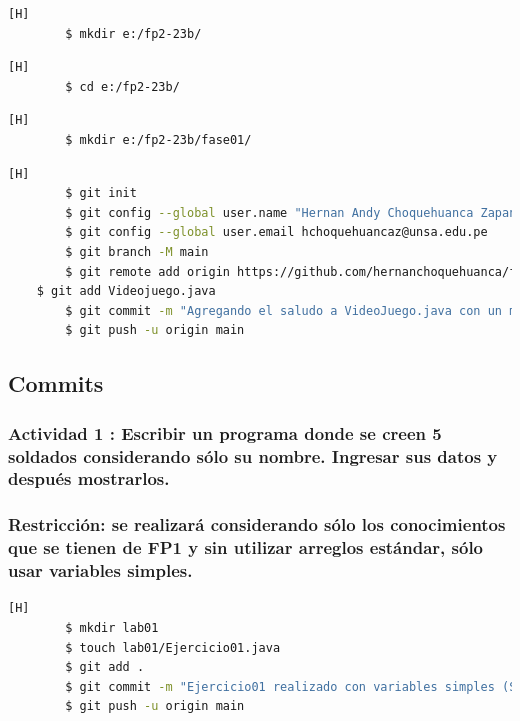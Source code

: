 \documentclass{article}
\begin{document}
	\begin{lstlisting}[language=bash,caption={Creando directorio de trabajo}][H]
		$ mkdir e:/fp2-23b/
	\end{lstlisting}
	\begin{lstlisting}[language=bash,caption={Dirijíéndonos al directorio de trabajo}][H]
		$ cd e:/fp2-23b/
	\end{lstlisting}	
	\begin{lstlisting}[language=bash,caption={Creando directorio para la primera fase}][H]
		$ mkdir e:/fp2-23b/fase01/
	\end{lstlisting}
	\begin{lstlisting}[language=bash,caption={Inicializando directorio para repositorio GitHub}][H]
		$ git init
		$ git config --global user.name "Hernan Andy Choquehuanca Zapana"
		$ git config --global user.email hchoquehuancaz@unsa.edu.pe
		$ git branch -M main
		$ git remote add origin https://github.com/hernanchoquehuanca/fp2-23b.git
   	$ git add Videojuego.java
		$ git commit -m "Agregando el saludo a VideoJuego.java con un mensaje de Bienvenida"
		$ git push -u origin main
	\end{lstlisting}


	\subsection{Commits}
    \subsubsection{Actividad 1 : Escribir un programa donde se creen 5 soldados considerando sólo su nombre. Ingresar sus datos y después mostrarlos. \\\\
    \color{red}Restricción: se realizará considerando sólo los conocimientos que se tienen de FP1 y sin utilizar arreglos estándar, sólo usar variables simples.}
	\begin{lstlisting}[language=bash,caption={Primer commit creando variables para los nombres de soldados}][H]
		$ mkdir lab01
		$ touch lab01/Ejercicio01.java
		$ git add .
		$ git commit -m "Ejercicio01 realizado con variables simples (Strings) para los datos de los 5 soldados"			
		$ git push -u origin main
	\end{lstlisting}
	
\end{document}
